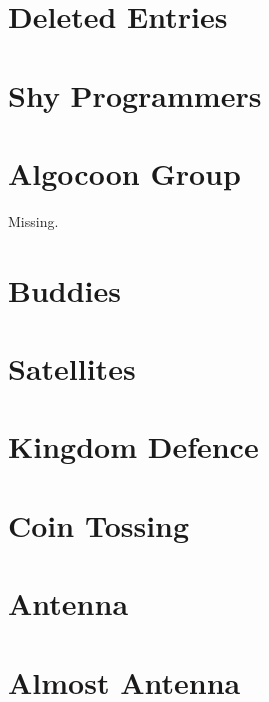 \documentclass[a4paper, 10pt]{article}
\let\stdsection\section
\renewcommand\section{\newpage\stdsection}
\newcommand{\includecode}[1]{
    }
\begin{document}
    \section{Deleted Entries}
        \includecode{../problems/w04/Deleted_Entries/DeletedEntries1.cpp}
    
    \section{Shy Programmers}
        \includecode{../problems/w04/Shy_Programmers/ShyProgrammers1.cpp}

    
    \section{Algocoon Group}
        Missing.
        
    \section{Buddies}
        \includecode{../problems/w05/Buddies/Buddies1.cpp}
        
    \section{Satellites}
        \includecode{../problems/w05/Satellites/Satellites1.cpp}
        
    \section{Kingdom Defence}
        \includecode{../problems/w05/Kingdom_Defense/KingdomDefence1.cpp}
    
    \section{Coin Tossing}
        \includecode{../problems/w05/Coin_Tossing/CoinToss1.cpp}
          

    \section{Antenna}
        \includecode{../problems/w06/Antenna/Antenna1.cpp}
        
    \section{Almost Antenna}
        \includecode{../problems/w06/AlmostAntenna/AlmostAntenna1.cpp}
        
\end{document}
